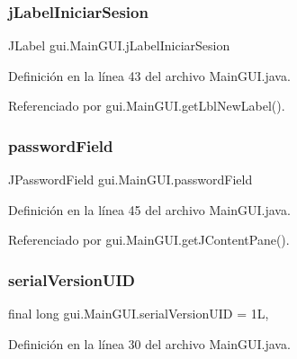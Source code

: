\subsubsection{\texorpdfstring{jLabelIniciarSesion}{jLabelIniciarSesion}}
{\footnotesize\ttfamily J\+Label gui.\+Main\+G\+U\+I.\+j\+Label\+Iniciar\+Sesion\hspace{0.3cm}{\ttfamily [protected]}}



Definición en la línea 43 del archivo Main\+G\+U\+I.\+java.



Referenciado por gui.\+Main\+G\+U\+I.\+get\+Lbl\+New\+Label().

\mbox{\label{classgui_1_1MainGUI_a61d033008de636b7bec5658cdebe8fd3}} 
\subsubsection{\texorpdfstring{passwordField}{passwordField}}
{\footnotesize\ttfamily J\+Password\+Field gui.\+Main\+G\+U\+I.\+password\+Field\hspace{0.3cm}{\ttfamily [private]}}



Definición en la línea 45 del archivo Main\+G\+U\+I.\+java.



Referenciado por gui.\+Main\+G\+U\+I.\+get\+J\+Content\+Pane().

\mbox{\label{classgui_1_1MainGUI_a75dfef8d845a0c8de7a6476c7f7d35e1}} 
\subsubsection{\texorpdfstring{serialVersionUID}{serialVersionUID}}
{\footnotesize\ttfamily final long gui.\+Main\+G\+U\+I.\+serial\+Version\+U\+ID = 1L\hspace{0.3cm}{\ttfamily [static]}, {\ttfamily [private]}}



Definición en la línea 30 del archivo Main\+G\+U\+I.\+java.

\mbox{\label{classgui_1_1MainGUI_a55b77c52b8af8b275ac73bb0965ed2f1}} 

